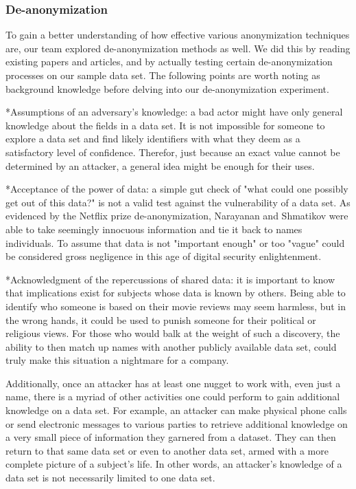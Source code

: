 \documentclass[10pt,journal,compsoc]{IEEEtran}
\begin{document}
\subsubsection{De-anonymization}
	To gain a better understanding of how effective various anonymization techniques are, our team explored de-anonymization methods as well.  We did this by reading existing papers and articles, and by actually testing certain de-anonymization processes on our sample data set.  The following points are worth noting as background knowledge before delving into our de-anonymization experiment. \linebreak

	*Assumptions of an adversary's knowledge: a bad actor might have only general knowledge about the fields in a data set.  It is not impossible for someone to explore a data set and find likely identifiers with what they deem as a satisfactory level of confidence.  Therefor, just because an exact value cannot be determined by an attacker, a general idea might be enough for their uses.\linebreak
	
	*Acceptance of the power of data:  a simple gut check of "what could one possibly get out of this data?" is not a valid test against the vulnerability of a data set.  As evidenced by the Netflix prize de-anonymization, Narayanan and Shmatikov were able to take seemingly innocuous information and tie it back to names individuals. \cite{narayanan}  To assume that data is not "important enough" or too "vague" could be considered gross negligence in this age of digital security enlightenment. \linebreak
	
	*Acknowledgment of the repercussions of shared data: it is important to know that implications exist for subjects whose data is known by others.  Being able to identify who someone is based on their movie reviews may seem harmless, but in the wrong hands, it could be used to punish someone for their political or religious views.  For those who would balk at the weight of such a discovery, the ability to then match up names with another publicly available data set, could truly make this situation a nightmare for a company. 
	
	Additionally, once an attacker has at least one nugget to work with, even just a name, there is a myriad of other activities one could perform to gain additional knowledge on a data set.  For example, an attacker can make physical phone calls or send electronic messages to various parties to retrieve additional knowledge on a very small piece of information they garnered from a dataset.  They can then return to that same data set or even to another data set, armed with a more complete picture of a subject's life.  In other words, an attacker's knowledge of a data set is not necessarily limited to one data set.\linebreak
	
\end{document}
